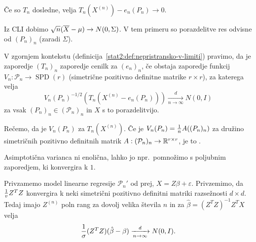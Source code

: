 \begin{primer}
  Če so $T_n$ dosledne, velja $T_n(X^{(n)}) - e_n(P_n) \to 0$.
\end{primer}

\begin{primer}
  Iz CLI dobimo $\sqrt{n} (\overline{X} - \mu) \to N(0, \Sigma)$.
  V tem primeru so porazdelitve res odvisne od $(P_n)_n$ (zaradi $\Sigma$).
\end{primer}


V zgornjem kontekstu (definicija~\ref{stat2:def:nepristransko-v-limiti})
pravimo, da je zaporedje $(T_n)_n$  zaporedje
cenilk za $(e_n)_n$, če obstaja zaporedje funkcij $V_n: \mathcal{P}_n \to
\operatorname{SPD}(r)$ (simetrične pozitivno definitne matrike $r \times r$), za
katerega velja
\[
  V_n(P_n)^{-1/2} (T_n(X^{(n)} - e_n(P_n))) \xrightarrow[n \to \infty]{d} N(0,
  I)
\]
za vsak $(P_n)_n \in (\mathcal{P}_n)_n$ in $X$ s to porazdelitvijo.

Rečemo, da je $V_n(P_n)$  za $T_n(X^{(n)})$.
Če je $V_n(P_n) = \frac{1}{n} A((P_n)_n)$ za družino simetričnih pozitivno
definitnih matrik $A: (\mathcal{P}_n)_n \to \mathbb{R}^{r \times r}$, je to
.

\begin{opomba}
  Asimptotična varianca ni enolična, lahko jo npr.~pomnožimo s poljubnim
  zaporedjem, ki konvergira k $1$.
\end{opomba}

\begin{izrek}
  Privzamemo model linearne regresije $\mathcal{P}_n'$ od prej, $X = Z \beta +
  \varepsilon$.
  Privzemimo, da $\frac{1}{v} Z^T Z$ konvergira k neki simetrični pozitivno
  definitni matriki razsežnosti $d \times d$.
  Tedaj imajo $Z^{(n)}$ poln rang za dovolj velika števila $n$ in za
  $\hat{\beta} = (Z^T Z)^{-1} Z^T X$ velja
  \[
	\frac{1}{\sigma} (Z^T Z) (\hat{\beta} - \beta) \xrightarrow[n \to \infty]{d}
	N(0, I).
  \]
\end{izrek}

